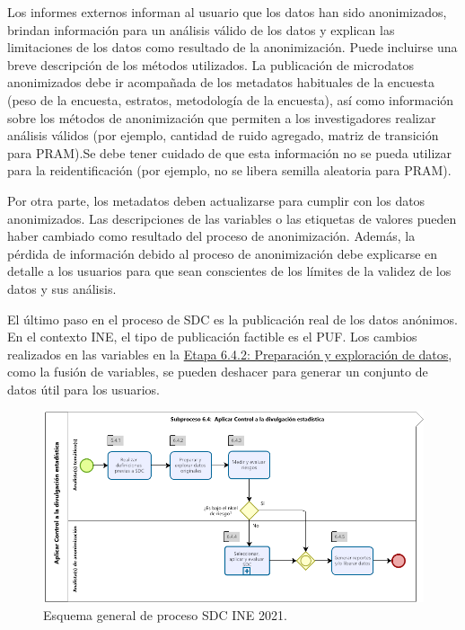 \documentclass[]{book}
\theoremstyle{definition}
\theoremstyle{definition}
\theoremstyle{definition}
\theoremstyle{definition}
\theoremstyle{remark}
\begin{document}
Los informes externos informan al usuario que los datos han sido anonimizados, brindan información para un análisis válido de los datos y explican las limitaciones de los datos como resultado de la anonimización. Puede incluirse una breve descripción de los métodos utilizados. La publicación de microdatos anonimizados debe ir acompañada de los metadatos habituales de la encuesta (peso de la encuesta, estratos, metodología de la encuesta), así como información sobre los métodos de anonimización que permiten a los investigadores realizar análisis válidos (por ejemplo, cantidad de ruido agregado, matriz de transición para PRAM).Se debe tener cuidado de que esta información no se pueda utilizar para la reidentificación (por ejemplo, no se libera semilla aleatoria para PRAM).

Por otra parte, los metadatos deben actualizarse para cumplir con los datos anonimizados. Las descripciones de las variables o las etiquetas de valores pueden haber cambiado como resultado del proceso de anonimización. Además, la pérdida de información debido al proceso de anonimización debe explicarse en detalle a los usuarios para que sean conscientes de los límites de la validez de los datos y sus análisis.

El último paso en el proceso de SDC es la publicación real de los datos anónimos. En el contexto INE, el tipo de publicación factible es el PUF. Los cambios realizados en las variables en la \protect\hyperlink{etapa-6.4.2-preparaciuxf3n-y-exploraciuxf3n-de-datos}{Etapa 6.4.2: Preparación y exploración de datos}, como la fusión de variables, se pueden deshacer para generar un conjunto de datos útil para los usuarios.

\begin{figure}

{\centering \includegraphics[width=0.9\linewidth]{Imagenes/Esquema_Proc_SDC} 

}

\caption{Esquema general de proceso SDC INE 2021.}\label{fig:esquemaSDC}
\end{figure}
\end{document}
